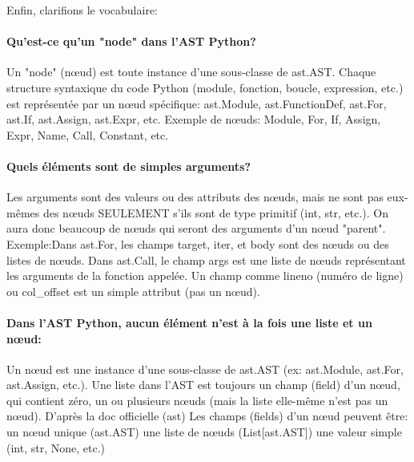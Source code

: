 \documentclass[11pt,a4paper]{article}
\begin{document}
Enfin, clarifions le vocabulaire: \paragraph{Qu'est-ce qu'un "node" dans l'AST Python?}
Un "node" (nœud) est toute instance d'une sous-classe de ast.AST.
Chaque structure syntaxique du code Python (module, fonction, boucle, expression, etc.) est représentée par un nœud spécifique:
ast.Module, ast.FunctionDef, ast.For, ast.If, ast.Assign, ast.Expr, etc.
Exemple de nœuds:
Module, For, If, Assign, Expr, Name, Call, Constant, etc.

\paragraph{Quels éléments sont de simples arguments?}
Les arguments sont des valeurs ou des attributs des nœuds, mais ne sont pas eux-mêmes des nœuds SEULEMENT s'ils sont de type primitif (int, str, etc.). On aura donc beaucoup de nœuds qui seront des arguments d'un nœud "parent".
Exemple:Dans ast.For, les champs target, iter, et body sont des nœuds ou des listes de nœuds.
Dans ast.Call, le champ args est une liste de nœuds représentant les arguments de la fonction appelée.
Un champ comme lineno (numéro de ligne) ou col\_offset est un simple attribut (pas un nœud).

\paragraph{Dans l'AST Python, aucun élément n'est à la fois une liste et un nœud:}
Un nœud est une instance d'une sous-classe de ast.AST (ex: ast.Module, ast.For, ast.Assign, etc.).
Une liste dans l'AST est toujours un champ (field) d'un nœud, qui contient zéro, un ou plusieurs nœuds (mais la liste elle-même n'est pas un nœud).
D'après la doc officielle (ast)
Les champs (fields) d'un nœud peuvent être:
un nœud unique (ast.AST)
une liste de nœuds (List[ast.AST])
une valeur simple (int, str, None, etc.)
\end{document}

